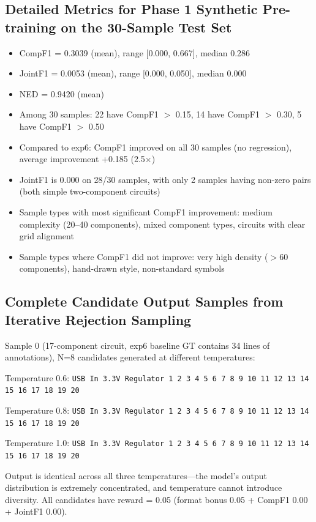 \subsection{Detailed Metrics for Phase 1 Synthetic Pre-training on the 30-Sample Test Set}

\begin{itemize}[nosep]
    \item CompF1 = 0.3039 (mean), range [0.000, 0.667], median 0.286
    \item JointF1 = 0.0053 (mean), range [0.000, 0.050], median 0.000
    \item NED = 0.9420 (mean)
    \item Among 30 samples: 22 have CompF1 $>$ 0.15, 14 have CompF1 $>$ 0.30, 5 have CompF1 $>$ 0.50
    \item Compared to exp6: CompF1 improved on all 30 samples (no regression), average improvement +0.185 (2.5$\times$)
    \item JointF1 is 0.000 on 28/30 samples, with only 2 samples having non-zero pairs (both simple two-component circuits)
    \item Sample types with most significant CompF1 improvement: medium complexity (20--40 components), mixed component types, circuits with clear grid alignment
    \item Sample types where CompF1 did not improve: very high density ($>$60 components), hand-drawn style, non-standard symbols
\end{itemize}

\subsection{Complete Candidate Output Samples from Iterative Rejection Sampling}

Sample 0 (17-component circuit, exp6 baseline GT contains 34 lines of annotations), N=8 candidates generated at different temperatures:

Temperature 0.6: \texttt{USB In 3.3V Regulator 1 2 3 4 5 6 7 8 9 10 11 12 13 14 15 16 17 18 19 20}

Temperature 0.8: \texttt{USB In 3.3V Regulator 1 2 3 4 5 6 7 8 9 10 11 12 13 14 15 16 17 18 19 20}

Temperature 1.0: \texttt{USB In 3.3V Regulator 1 2 3 4 5 6 7 8 9 10 11 12 13 14 15 16 17 18 19 20}

Output is identical across all three temperatures---the model's output distribution is extremely concentrated, and temperature cannot introduce diversity. All candidates have reward = 0.05 (format bonus 0.05 + CompF1 0.00 + JointF1 0.00).

